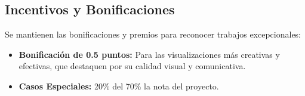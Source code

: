 \documentclass[12pt]{article}
\begin{document}
\subsection{Incentivos y Bonificaciones}

Se mantienen las bonificaciones y premios para reconocer trabajos excepcionales:
\begin{itemize}
    \item \textbf{Bonificación de 0.5 puntos:} Para las visualizaciones más creativas y efectivas, que destaquen por su calidad visual y comunicativa.
    \item \textbf{Casos Especiales:} 20\% del 70\% la nota del proyecto.
\end{itemize}
\end{document}
